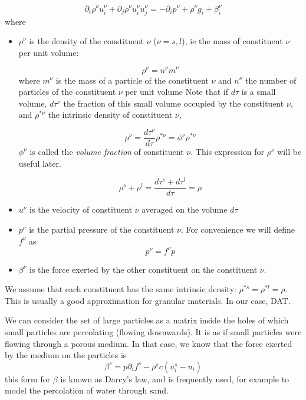 \documentclass[11pt]{book}
\begin{document}
\begin{equation} \label{eq:mom_bal}
	\partial_t \rho^\nu u_i^\nu + \partial_j \rho^\nu u_i^\nu u_j^\nu = -\partial_i p^\nu + \rho^\nu g_i + \beta^\nu_i 
\end{equation}
where
\begin{itemize}
\item $\rho^\nu$ is the density of the constituent $\nu$ ($\nu = s,l$), ie the mass of constituent $\nu$ per unit volume:

\[
\rho^\nu = n^\nu m^\nu
\]
where $m^\nu$ is the mass of a particle of the constituent $\nu$ and $n^\nu$ the number of particles of the constituent $\nu$ per unit volume
Note that if $d\tau$ is a small volume, $d\tau^\nu$ the fraction of this small volume occupied by the constituent $\nu$, and $\rho^{*\nu}$ the intrinsic density of constituent $\nu$, 

\begin{equation} \label{eq:1}
\rho^\nu = \frac{d\tau^\nu}{d\tau} \rho^{*\nu} = \phi^{\nu} \rho^{*\nu}
\end{equation}
$\phi^\nu$ is called the \textit{volume fraction} of constituent $\nu$. This expression for $\rho^\nu$ will be useful later.

\[
\rho^s + \rho^l = \frac{d\tau^s + d\tau^l}{d\tau} = \rho
\]

\item $u^\nu$ is the velocity of constituent $\nu$ averaged on the volume $d\tau$

\item $p^\nu$ is the partial pressure of the constituent $\nu$. For convenience we will define $f^\nu$ as
\begin{equation}
p^\nu = f^\nu p
\end{equation}

\item $\beta^\nu$ is the force exerted by the other constituent on the constituent $\nu$.
\end{itemize}

We assume that each constituent has the same intrinsic density: $\rho^{*s}=\rho^{*l}=\rho$. This is usually a good approximation for granular materials. In our case, DAT.

We can consider the set of large particles as a matrix inside the holes of which small particles are percolating (flowing downwards).
It is as if small particles were flowing through a porous medium. In that case, we know that the force exerted by the medium on the particles is 
\begin{equation}
\beta^s = p \partial_i f^s - \rho^s c (u^s_i - u_i)
\end{equation}
this form for $\beta$ is known as Darcy's law, and is frequently used, for example to model the percolation of water through sand.
\end{document}
